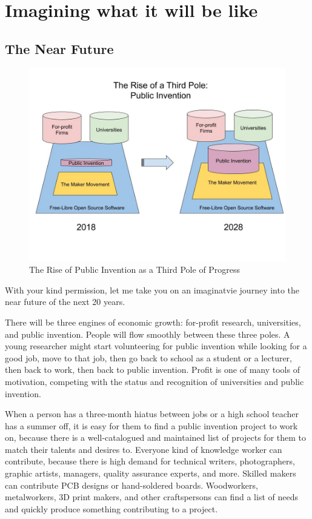 \documentclass[
	fontsize=10pt, %
	twoside=false, %
	secnumdepth=1, %
]{kaobook}
\begin{document}
\chapter{Imagining what it will be like}

\section{The Near Future}

\begin{figure}
  \includegraphics{figures/The_Rise_of_Public_Invention.jpg}
  \caption{The Rise of Public Invention as a Third Pole of Progress}
\end{figure}

With your kind permission, let me take you on an
imaginatvie journey into the near future of the next 20 years.

There will be three engines of economic growth:
for-profit research, universities, and public invention.
People will flow smoothly between these three poles.
A young researcher might start volunteering for public invention while
looking for a good job, move to that job, then go back to school
as a student or a lecturer,
then back to work, then back to public invention.
Profit is one of many tools of motivation, competing with
the status and recognition of universities and public invention.

When a person has a three-month hiatus between jobs or a
high school teacher has a summer off, it is easy for them to find
a public invention project to work on, because there is a
well-catalogued and maintained list of projects for them to match
their talents and desires to.
Everyone kind of knowledge worker can contribute, because
there is high demand for technical writers, photographers,
graphic artists, managers, quality assurance experts, and more.
Skilled makers can contribute PCB designs or hand-soldered boards.
Woodworkers, metalworkers, 3D print makers, and other craftspersons
can find a list of needs and quickly produce something contributing
to a project.
\end{document}
